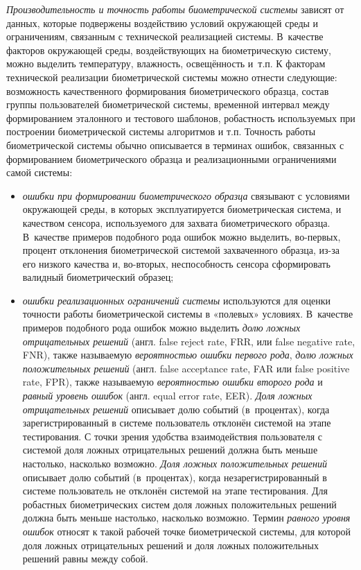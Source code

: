 \documentclass[12pt]{book}
\begin{document}
{\textit{Производительность и точность работы биометрической системы} зависят от данных, которые подвержены воздействию условий окружающей среды и ограничениям, связанным с технической реализацией системы. В~качестве факторов окружающей среды, воздействующих на биометрическую систему, можно выделить температуру, влажность, освещённость и~т.п. К факторам технической реализации биометрической системы можно отнести следующие: возможность качественного формирования биометрического образца, состав группы пользователей биометрической системы, временной интервал между формированием эталонного и тестового шаблонов, робастность используемых при построении биометрической системы алгоритмов и т.п. Точность работы биометрической системы обычно описывается в терминах ошибок, связанных с формированием биометрического образца и реализационными ограничениями самой системы:

\begin{itemize}[topsep=1pt] \itemsep0.1em
\item \textit{ошибки при формировании биометрического образца} связывают с условиями окружающей среды, в которых эксплуатируется биометрическая система, и качеством сенсора, используемого для захвата биометрического образца. В~качестве примеров подобного рода ошибок можно выделить, во-первых, процент отклонения биометрической системой захваченного образца, из-за его низкого качества и, во-вторых, неспособность сенсора сформировать валидный биометрический образец;

\item \textit{ошибки реализационных ограничений системы} используются для оценки точности работы биометрической системы в «полевых» условиях. В~качестве примеров подобного рода ошибок можно выделить \textit{долю ложных отрицательных решений} (англ. false reject rate, FRR, или false negative rate, FNR), также называемую \textit{вероятностью ошибки первого рода}, \textit{долю ложных  положительных решений} (англ. false acceptance rate, FAR или false positive rate, FPR), также называемую \textit{вероятностью ошибки второго рода} и \textit{равный уровень ошибок} (англ. equal error rate, EER). \textit{Доля ложных отрицательных решений} описывает долю событий (в~процентах), когда зарегистрированный в системе пользователь отклонён системой на этапе тестирования. С точки зрения удобства взаимодействия пользователя с системой доля ложных отрицательных решений должна быть меньше настолько, насколько возможно. \textit{Доля ложных положительных решений} описывает долю событий (в~процентах), когда незарегистрированный в системе пользователь не отклонён системой на этапе тестирования. Для робастных биометрических систем доля ложных положительных решений должна быть меньше настолько, насколько возможно. Термин \textit{равного уровня ошибок} относят к такой рабочей точке биометрической системы, для которой доля ложных отрицательных решений и доля ложных положительных решений равны между собой.


\end{itemize}}
\end{document}
